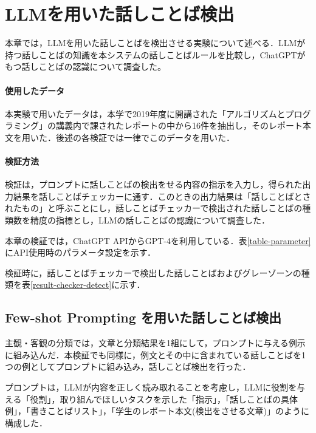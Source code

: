 \chapter{LLMを用いた話しことば検出 \label{c7}}

本章では，LLMを用いた話しことばを検出させる実験について述べる．LLMが持つ話しことばの知識を本システムの話しことばルールを比較し，ChatGPTがもつ話しことばの認識について調査した。

\subsubsection{使用したデータ}
本実験で用いたデータは，本学で2019年度に開講された「アルゴリズムとプログラミング」の講義内で課されたレポートの中から16件を抽出し，そのレポート本文を用いた．後述の各検証では一律でこのデータを用いた．

\subsubsection{検証方法}
検証は，プロンプトに話しことばの検出をせる内容の指示を入力し，得られた出力結果を話しことばチェッカーに通す．このときの出力結果は「話しことばとされたもの」と呼ぶことにし，話しことばチェッカーで検出された話しことばの種類数を精度の指標とし，LLMの話しことばの認識について調査した．

本章の検証では，ChatGPT APIからGPT-4を利用している．表\ref{table-parameter}にAPI使用時のパラメータ設定を示す．

検証時に，話しことばチェッカーで検出した話しことばおよびグレーゾーンの種類を表\ref{result-checker-detect}に示す．




\section{Few-shot Prompting を用いた話しことば検出 \label{c7s1}}
主観・客観の分類では，文章と分類結果を1組にして，プロンプトに与える例示に組み込んだ．本検証でも同様に，例文とその中に含まれている話しことばを1つの例としてプロンプトに組み込み，話しことば検出を行った．



プロンプトは，LLMが内容を正しく読み取れることを考慮し，LLMに役割を与える「役割」，取り組んでほしいタスクを示した「指示」，「話しことばの具体例」，「書きことばリスト」，「学生のレポート本文(検出をさせる文章)」のように構成した．

